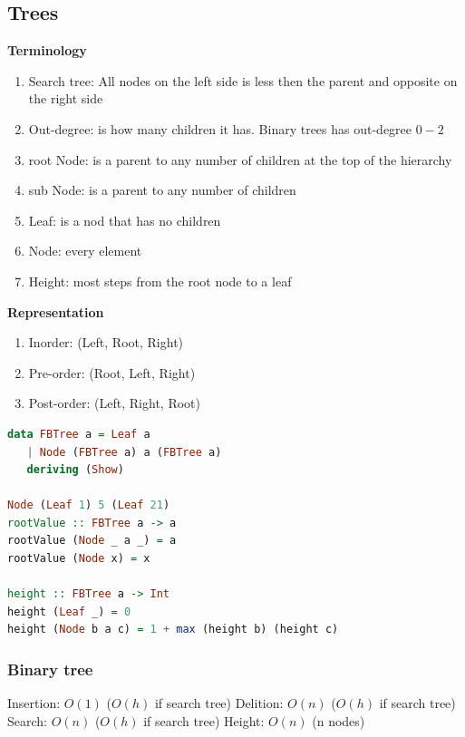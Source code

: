 \subsection{Trees}
\noindent\textbf{Terminology}
\begin{enumerate}
\item Search tree: All nodes on the left side is less then the parent and opposite on the right side    
\item Out-degree: is how many children it has. Binary trees has out-degree $0-2$
\item root Node: is a parent to any number of children at the top of the hierarchy
\item sub Node: is a parent to any number of children
\item Leaf: is a nod that has no children
\item Node: every element
\item Height: most steps from the root node to a leaf  
\end{enumerate}

\noindent\textbf{Representation}
\begin{enumerate}
\item Inorder: (Left, Root, Right)
\item Pre-order: (Root, Left, Right)
\item Post-order: (Left, Right, Root)
\end{enumerate}

\begin{lstlisting}[language=Haskell]
data FBTree a = Leaf a
   | Node (FBTree a) a (FBTree a)
   deriving (Show)
   
Node (Leaf 1) 5 (Leaf 21)
rootValue :: FBTree a -> a
rootValue (Node _ a _) = a
rootValue (Node x) = x

height :: FBTree a -> Int
height (Leaf _) = 0
height (Node b a c) = 1 + max (height b) (height c)
\end{lstlisting}


\subsubsection{Binary tree}
Insertion: $O(1)$  ($O(h)$ if search tree) \newline 
Delition: $O(n)$   ($O(h)$ if search tree) \newline
Search: $O(n)$  ($O(h)$ if search tree)    \newline
Height: $O(n)$ (n nodes)                   \newline


